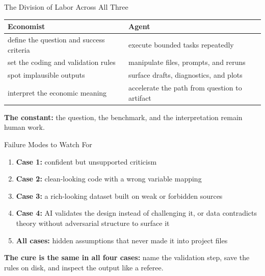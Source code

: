 \documentclass[10pt,english,aspectratio=169]{beamer}
\begin{document}
\begin{frame}{The Division of Labor Across All Three}
\small
\begin{tabular}{p{5.9cm}p{6.0cm}}
\toprule
\textbf{Economist} & \textbf{Agent} \\
\midrule
define the question and success criteria & execute bounded tasks repeatedly \\
set the coding and validation rules & manipulate files, prompts, and reruns \\
spot implausible outputs & surface drafts, diagnostics, and plots \\
interpret the economic meaning & accelerate the path from question to artifact \\
\bottomrule
\end{tabular}

\vspace{0.3cm}
\textbf{The constant:} the question, the benchmark, and the interpretation remain human work.
\end{frame}

\begin{frame}{Failure Modes to Watch For}
\begin{enumerate}
    \item \textbf{Case 1:} confident but unsupported criticism
    \item \textbf{Case 2:} clean-looking code with a wrong variable mapping
    \item \textbf{Case 3:} a rich-looking dataset built on weak or forbidden sources
    \item \textbf{Case 4:} AI validates the design instead of challenging it, or data contradicts theory without adversarial structure to surface it
    \item \textbf{All cases:} hidden assumptions that never made it into project files
\end{enumerate}

\vspace{0.3cm}
\textbf{The cure is the same in all four cases:} name the validation step, save the rules on disk, and inspect the output like a referee.
\end{frame}
\end{document}
